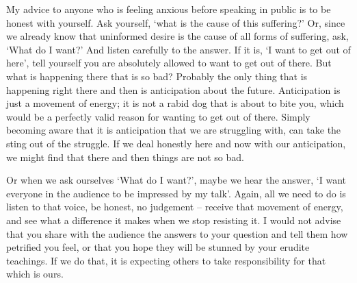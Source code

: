 My advice to anyone who is feeling anxious before speaking in public is
to be honest with yourself. Ask yourself, `what is the cause of this
suffering?' Or, since we already know that uninformed desire is the
cause of all forms of suffering, ask, `What do I want?' And listen
carefully to the answer. If it is, `I want to get out of here', tell
yourself you are absolutely allowed to want to get out of there. But
what is happening there that is so bad? Probably the only thing that is
happening right there and then is anticipation about the future.
Anticipation is just a movement of energy; it is not a rabid dog that is
about to bite you, which would be a perfectly valid reason for wanting
to get out of there. Simply becoming aware that it is anticipation that
we are struggling with, can take the sting out of the struggle. If we
deal honestly here and now with our anticipation, we might find that
there and then things are not so bad.

Or when we ask ourselves `What do I want?', maybe we hear the answer, `I
want everyone in the audience to be impressed by my talk'. Again, all we
need to do is listen to that voice, be honest, no judgement -- receive
that movement of energy, and see what a difference it makes when we stop
resisting it. I would not advise that you share with the audience the
answers to your question and tell them how petrified you feel, or that
you hope they will be stunned by your erudite teachings. If we do that,
it is expecting others to take responsibility for that which is ours.

